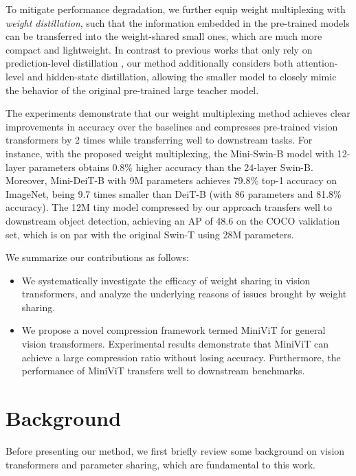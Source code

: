\documentclass[10pt,twocolumn,letterpaper]{article}
\begin{document}
To mitigate performance degradation, we further equip weight multiplexing with \emph{weight distillation}, such that the information embedded in the pre-trained models can be transferred into the weight-shared small ones, which are much more compact and lightweight. In contrast to previous works that only rely on prediction-level distillation \cite{deit, jia2021efficient}, our method additionally considers both attention-level and hidden-state distillation, allowing the smaller
model to closely mimic the behavior of the original pre-trained large teacher model.



The experiments demonstrate that our weight multiplexing method achieves clear improvements in accuracy over the baselines and compresses pre-trained vision transformers by 2 times while transferring well to downstream tasks. For instance, with the proposed weight multiplexing, the Mini-Swin-B model with 12-layer parameters obtains 0.8\% higher accuracy than the 24-layer Swin-B. Moreover, Mini-DeiT-B with 9M parameters achieves 79.8\% top-1 accuracy on ImageNet, being 9.7 times smaller than DeiT-B (with 86 parameters and 81.8\% accuracy). The 12M tiny model compressed by our approach transfers well to downstream object detection, achieving an AP of 48.6 on the COCO validation set, which is on par with the original Swin-T using 28M parameters.


We summarize our contributions as follows:
\vspace{-2mm}
\begin{itemize}[leftmargin=0.468cm]
	\item{We systematically investigate the efficacy of weight sharing in vision transformers, and analyze the underlying reasons of issues brought by weight sharing.}
\vspace{-2mm}
	\item{We propose a novel compression framework termed MiniViT for general vision transformers. Experimental results demonstrate that MiniViT can achieve a large compression ratio without losing accuracy. Furthermore, the performance of MiniViT transfers well to downstream benchmarks.}

\end{itemize}
\section{Background}
Before presenting our method, we first briefly review some background on vision transformers and parameter sharing, which are fundamental to this work.
\end{document}
